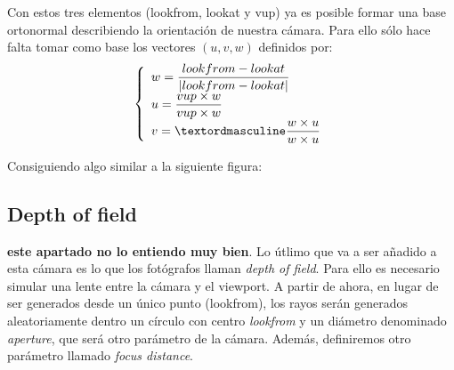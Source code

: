 \documentclass[12pt]{article}
\theoremstyle{definition}
\theoremstyle{remark}
\begin{document}
Con estos tres elementos (lookfrom, lookat y vup) ya es posible formar una base ortonormal describiendo la orientación de nuestra cámara. Para ello sólo hace falta tomar como base los vectores $(u,v,w)$ definidos por:
\[
\left\{\begin{array}{lll}
w = \displaystyle\frac{lookfrom-lookat}{|lookfrom-lookat|}\\
u = \displaystyle\frac{vup\times w}{vup\times w}\\
v = \displaystyleº\frac{w\times u}{w\times u}\\
\end{array}
\right.
\]

Consiguiendo algo similar a la siguiente figura:

\begin{figure}[H]
\centering
{}
\end{figure}

\subsection{Depth of field}

\textbf{este apartado no lo entiendo muy bien}. Lo útlimo que va a ser añadido a esta cámara es lo que los fotógrafos llaman \textit{depth of field}. Para ello es necesario simular una lente entre la cámara y el viewport. A partir de ahora, en lugar de ser generados desde un único punto (lookfrom), los rayos serán generados aleatoriamente dentro un círculo con centro \textit{lookfrom} y un diámetro denominado \textit{aperture}, que será otro parámetro de la cámara. Además, definiremos otro parámetro llamado \textit{focus distance}.
\end{document}
